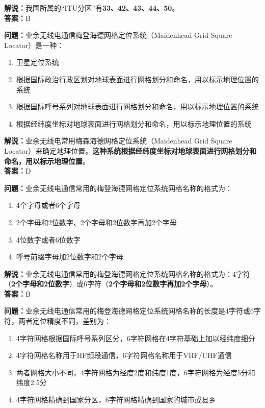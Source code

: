 \textbf{解说：}我国所属的“ITU分区”有\textbf{33、42、43、44、50}。\\\textbf{答案：}B



\textbf{问题：}业余无线电通信梅登海德网格定位系统（Maidenhead Grid Square Locator）是一种：

\begin{enumerate}[label=\Alph*), leftmargin=1.5cm]
	\item 卫星定位系统
	\item 根据国际政治行政区划对地球表面进行网格划分和命名，用以标示地理位置的系统
	\item 根据国际呼号系列对地球表面进行网格划分和命名，用以标示地理位置的系统
	\item 根据经纬度坐标对地球表面进行网格划分和命名，用以标示地理位置的系统
\end{enumerate}

\textbf{解说：}业余无线电常用梅森海德网格定位系统（Maidenhead Grid Square Locator）来确定地理位置。\textbf{这种系统根据经纬度坐标对地球表面进行网格划分和命名，用以标示地理位置}。\\\textbf{答案：}D



\textbf{问题：}业余无线电通信常用的梅登海德网格定位系统网格名称的格式为：

\begin{enumerate}[label=\Alph*), leftmargin=1.5cm]
	\item 4个字母或者6个字母
	\item 2个字母和2位数字、2个字母和2位数字再加2个字母
	\item 4位数字或者6位数字
	\item 呼号前缀字母加2位数字和2个字母
\end{enumerate}

\textbf{解说：}业余无线电通信常用的梅登海德网格定位系统网格名称的格式为：4字符（\textbf{2个字母和2位数字}）或6字符（\textbf{2个字母和2位数字再加2个字母}）。\\\textbf{答案：}B



\textbf{问题：}业余无线电通信常用的梅登海德网格定位系统网格名称的长度是4字符或6字符，两者定位精度不同，差别为：

\begin{enumerate}[label=\Alph*), leftmargin=1.5cm]
	\item 4字符网格根据国际呼号系列区分，6字符网格在4字符基础上加以经纬度细分
	\item 4字符网格名称用于HF频段通信，6字符网格名称用于VHF/UHF通信
	\item 两者网格大小不同，4字符网格为经度2度和纬度1度，6字符网格为经度5分和纬度2.5分
	\item 4字符网格精确到国家分区，6字符网格精确到国家的城市或县乡
\end{enumerate}

